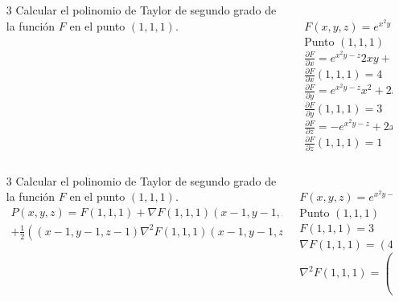 \documentclass[aspectratio=149,10pt,xcolor=dvipsnames,t]{beamer}
\begin{document}
\begin{frame}
\begin{columns}
\begin{column}[T]{0.7\textwidth}
\begin{enumerate}
\item[3] Calcular el polinomio de Taylor de segundo grado de la función $F$ en el punto $(1,1,1)$.
\end{enumerate}
\end{column}
\begin{column}[T]{0.3\textwidth}
\\
$F(x,y,z)=e^{x^2y-z}+2xyz$\\
Punto $(1,1,1)$\\
$\frac{\partial F}{\partial x}=e^{x^2y-z}2xy+2yz$\\
$\frac{\partial F}{\partial x}(1,1,1)=4$\\
$\frac{\partial F}{\partial y}=e^{x^2y-z}x^2+2xz$\\
$\frac{\partial F}{\partial y}(1,1,1)=3$\\
$\frac{\partial F}{\partial z}=-e^{x^2y-z}+2xy$\\
$\frac{\partial F}{\partial z}(1,1,1)=1$
\end{column}
\end{columns}
\end{frame}


\begin{frame}
\begin{columns}
\begin{column}[T]{0.7\textwidth}
\begin{enumerate}
\item[3] Calcular el polinomio de Taylor de segundo grado de la función $F$ en el punto $(1,1,1)$.
\begin{align*}
P(x,y,z)=F(1,1,1)+\nabla F(1,1,1)(x-1,y-1,z-1)+\\
+\frac{1}{2}((x-1,y-1,z-1)\nabla^2F(1,1,1)(x-1,y-1,z-1))
\end{align*}
\end{enumerate}
\end{column}
\begin{column}[T]{0.3\textwidth}
\\
$F(x,y,z)=e^{x^2y-z}+2xyz$\\
Punto $(1,1,1)$\\
$F(1,1,1)=3$\\
$\nabla F(1,1,1)=(4,3,1)$\\
$\nabla^2F(1,1,1)=\left(
\begin{array}{ccc}
6 & 6 & 0\\
6 & 1 & 1\\
0 & 1 & 1\\
\end{array}
\right)$
\end{column}
\end{columns}
\end{frame}
\end{document}
